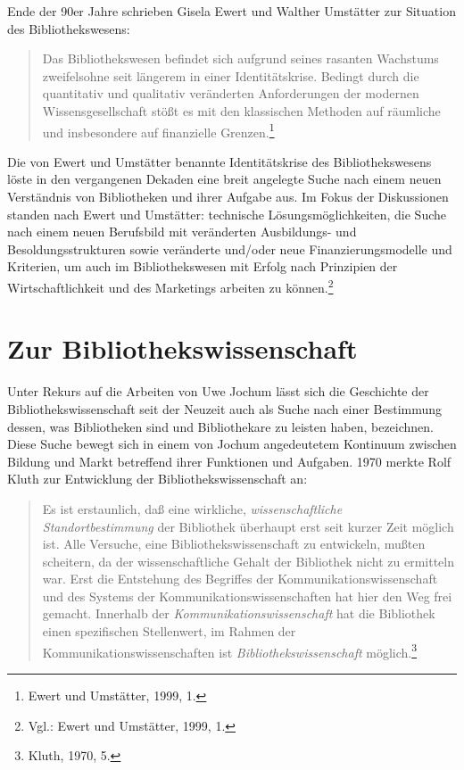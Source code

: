 \documentclass[a4paper,
fontsize=11pt,
oneside,
numbers=noperiodatend,
parskip=half-,
bibliography=totoc,
final
]{scrartcl}
\begin{document}
Ende der 90er Jahre schrieben Gisela Ewert und Walther Umstätter zur
Situation des Bibliothekswesens:

\begin{quote}
Das Bibliothekswesen befindet sich aufgrund seines rasanten Wachstums
zweifelsohne seit längerem in einer Identitätskrise. Bedingt durch die
quantitativ und qualitativ veränderten Anforderungen der modernen
Wissensgesellschaft stößt es mit den klassischen Methoden auf räumliche
und insbesondere auf finanzielle Grenzen.\footnote{Ewert und Umstätter,
  1999, 1.}
\end{quote}

Die von Ewert und Umstätter benannte Identitätskrise des
Bibliothekswesens löste in den vergangenen Dekaden eine breit angelegte
Suche nach einem neuen Verständnis von Bibliotheken und ihrer Aufgabe
aus. Im Fokus der Diskussionen standen nach Ewert und Umstätter:
technische Lösungsmöglichkeiten, die Suche nach einem neuen Berufsbild
mit veränderten Ausbildungs- und Besoldungsstrukturen sowie veränderte
und/oder neue Finanzierungsmodelle und Kriterien, um auch im
Bibliothekswesen mit Erfolg nach Prinzipien der Wirtschaftlichkeit und
des Marketings arbeiten zu können.\footnote{Vgl.: Ewert und Umstätter,
  1999, 1.}

\section*{Zur
Bibliothekswissenschaft}\label{zur-bibliothekswissenschaft}

Unter Rekurs auf die Arbeiten von Uwe Jochum lässt sich die Geschichte
der Bibliothekswissenschaft seit der Neuzeit auch als Suche nach einer
Bestimmung dessen, was Bibliotheken sind und Bibliothekare zu leisten
haben, bezeichnen. Diese Suche bewegt sich in einem von Jochum
angedeutetem Kontinuum zwischen Bildung und Markt betreffend ihrer
Funktionen und Aufgaben. 1970 merkte Rolf Kluth zur Entwicklung der
Bibliothekswissenschaft an:

\begin{quote}
Es ist erstaunlich, daß eine wirkliche, \emph{wissenschaftliche
Standortbestimmung} der Bibliothek überhaupt erst seit kurzer Zeit
möglich ist. Alle Versuche, eine Bibliothekswissenschaft zu entwickeln,
mußten scheitern, da der wissenschaftliche Gehalt der Bibliothek nicht
zu ermitteln war. Erst die Entstehung des Begriffes der
Kommunikationswissenschaft und des Systems der
Kommunikationswissenschaften hat hier den Weg frei gemacht. Innerhalb
der \emph{Kommunikationswissenschaft} hat die Bibliothek einen
spezifischen Stellenwert, im Rahmen der Kommunikationswissenschaften ist
\emph{Bibliothekswissenschaft} möglich.\footnote{Kluth, 1970, 5.}
\end{quote}
\end{document}
